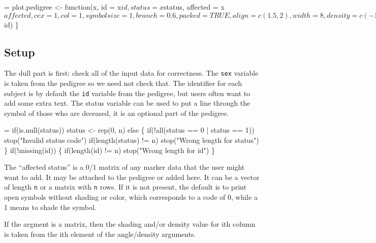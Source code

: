 \documentclass{article}
\begin{document}
\begin{nwchunk}
=
 plot.pedigree <- function(x, id = x$id, status = x$status, 
                           affected = x$affected, 
                           cex = 1, col = 1,
                           symbolsize = 1, branch = 0.6, 
                           packed = TRUE, align = c(1.5,2), width = 8, 
                           density=c(-1, 35,65,20), mar=c(4.1, 1, 4.1, 1),
                           angle=c(90,65,40,0), keep.par=FALSE,
                           subregion, pconnect=.5, ...)
 \{
     Call <- match.call()
     n <- length(x$id)        
     \}
\end{nwchunk}

\subsection{Setup}
The dull part is first: check all of the input data for
correctness.  
The \Verb!sex! variable is taken from the pedigree so we need not check
that. 
The identifier for each subject is by default the \Verb!id! variable from
the pedigree, but users often want to add some extra text.
The status variable can be used to put a line through the symbol
of those who are deceased, it is an optional part of the pedigree.
\begin{nwchunk}
=
 if(is.null(status))
   status <- rep(0, n)
 else \{
     if(!all(status == 0 | status == 1))
       stop("Invalid status code")
     if(length(status) != n)
       stop("Wrong length for status")
 \}
 if(!missing(id)) \{
     if(length(id) != n)
       stop("Wrong length for id")
 \}
\end{nwchunk}
The ``affected status'' is a 0/1 matrix of any marker data that the
user might want to add.  It may be attached to the pedigree or added
here.  It can be a vector of length \Verb!n! or a matrix with \Verb?n? rows.
If it is not present, the default is to print open symbols without
shading or color, which corresponds to a code of 0, while a 1 means to
shade the symbol.  

If the argment is a matrix, then the shading and/or density value for
ith column is taken from the ith element of the angle/density arguments.
\end{document}
